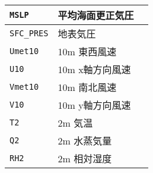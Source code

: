 {\begin{table}[tbh]
\begin{center}
\begin{tabularx}{150mm}{llp{80mm}}
\verb|MSLP| & 平均海面更正気圧 & \\ \hline
\verb|SFC_PRES| & 地表気圧 & \\ \hline
\verb|Umet10| & 10m 東西風速 & \\ \hline
\verb|U10| & 10m x軸方向風速 & \\ \hline
\verb|Vmet10| & 10m 南北風速 & \\ \hline
\verb|V10| & 10m y軸方向風速 & \\ \hline
\verb|T2| & 2m 気温 & \\ \hline
\verb|Q2| & 2m 水蒸気量 & \\ \hline
\verb|RH2| & 2m 相対湿度 & \\ \hline
\end{tabularx}
\end{center}
\end{table}

}
